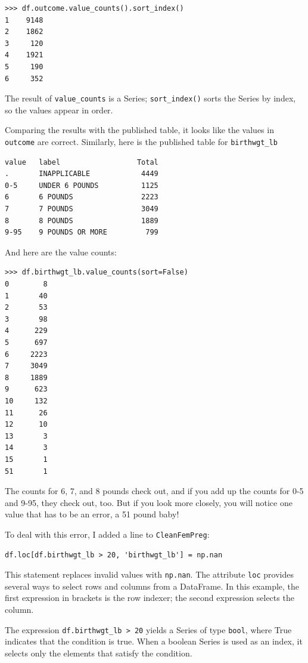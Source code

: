 \documentclass[12pt]{book}
\begin{document}
\begin{verbatim}
>>> df.outcome.value_counts().sort_index()
1    9148
2    1862
3     120
4    1921
5     190
6     352
\end{verbatim}

The result of \verb"value_counts" is a Series;
\verb"sort_index()" sorts the Series by index, so the values
appear in order.

Comparing the results with the published table, it looks like the
values in \verb"outcome" are correct.  Similarly, here is the published
table for \verb"birthwgt_lb"

\begin{verbatim}
value   label                  Total
.       INAPPLICABLE            4449
0-5     UNDER 6 POUNDS          1125
6       6 POUNDS                2223
7       7 POUNDS                3049
8       8 POUNDS                1889
9-95    9 POUNDS OR MORE         799
\end{verbatim}

And here are the value counts:

\begin{verbatim}
>>> df.birthwgt_lb.value_counts(sort=False)
0        8
1       40
2       53
3       98
4      229
5      697
6     2223
7     3049
8     1889
9      623
10     132
11      26
12      10
13       3
14       3
15       1
51       1
\end{verbatim}

The counts for 6, 7, and 8 pounds check out, and if you add
up the counts for 0-5 and 9-95, they check out, too.  But
if you look more closely, you will notice one value that has to be
an error, a 51 pound baby!

To deal with this error, I added a line to \verb"CleanFemPreg":

\begin{verbatim}
df.loc[df.birthwgt_lb > 20, 'birthwgt_lb'] = np.nan
\end{verbatim}

This statement replaces invalid values with \verb"np.nan".
The attribute \verb"loc" provides several ways to select
rows and columns from a DataFrame.  In this example, the
first expression in brackets is the row indexer; the second
expression selects the column.

The expression \verb"df.birthwgt_lb > 20" yields a Series of type
\verb"bool", where True indicates that the condition is true.  When a
boolean Series is used as an index, it selects only the elements that
satisfy the condition.
  
\end{document}
